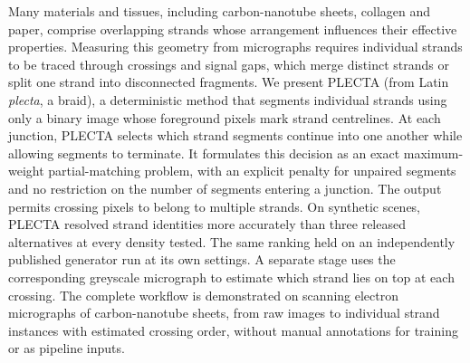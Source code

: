 Many materials and tissues, including carbon-nanotube sheets, collagen and
paper, comprise overlapping strands whose arrangement influences their
effective properties. Measuring this geometry from
micrographs requires individual strands to be traced through crossings and
signal gaps, which merge distinct strands or split one strand into disconnected
fragments. We present PLECTA (from Latin \emph{plecta}, a braid), a
deterministic method that segments individual strands using only a binary
image whose foreground pixels mark strand centrelines. At each junction,
PLECTA selects which strand segments continue into one another while
allowing segments to terminate. It formulates
this decision as an exact maximum-weight partial-matching problem, with an
explicit penalty for unpaired segments and no restriction on the number of
segments entering a junction. The output permits crossing pixels to belong to
multiple strands. On synthetic scenes, PLECTA resolved strand identities
more accurately than three released alternatives at every density tested. The
same ranking held on an independently published generator run at its own
settings. A separate stage
uses the corresponding greyscale micrograph to estimate which strand lies on
top at each crossing. The
complete workflow is demonstrated on scanning electron micrographs of
carbon-nanotube sheets, from raw images to individual strand instances with
estimated crossing order, without manual annotations for training or as
pipeline inputs.

